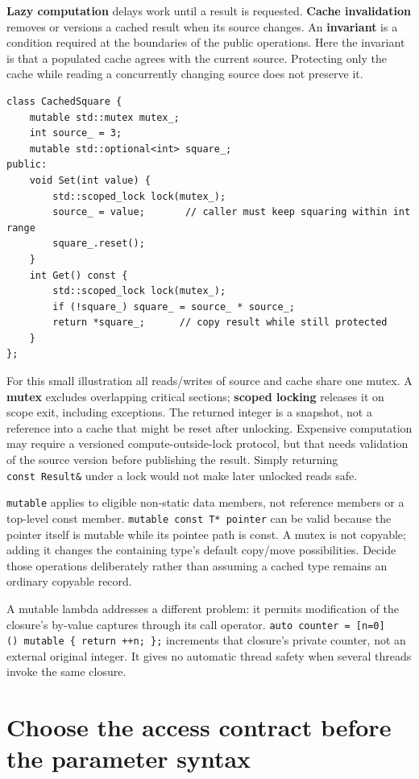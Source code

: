 \textbf{Lazy computation} delays work until a result is requested. \textbf{Cache invalidation} removes or versions a cached result when its source changes. An \textbf{invariant} is a condition required at the boundaries of the public operations. Here the invariant is that a populated cache agrees with the current source. Protecting only the cache while reading a concurrently changing source does not preserve it.

\begin{verbatim}
class CachedSquare {
    mutable std::mutex mutex_;
    int source_ = 3;
    mutable std::optional<int> square_;
public:
    void Set(int value) {
        std::scoped_lock lock(mutex_);
        source_ = value;       // caller must keep squaring within int range
        square_.reset();
    }
    int Get() const {
        std::scoped_lock lock(mutex_);
        if (!square_) square_ = source_ * source_;
        return *square_;      // copy result while still protected
    }
};
\end{verbatim}

For this small illustration all reads/writes of source and cache share one mutex. A \textbf{mutex} excludes overlapping critical sections; \textbf{scoped locking} releases it on scope exit, including exceptions. The returned integer is a snapshot, not a reference into a cache that might be reset after unlocking. Expensive computation may require a versioned compute-outside-lock protocol, but that needs validation of the source version before publishing the result. Simply returning \texttt{const\ Result\&} under a lock would not make later unlocked reads safe.

\texttt{mutable} applies to eligible non-static data members, not reference members or a top-level const member. \texttt{mutable\ const\ T*\ pointer} can be valid because the pointer itself is mutable while its pointee path is const. A mutex is not copyable; adding it changes the containing type's default copy/move possibilities. Decide those operations deliberately rather than assuming a cached type remains an ordinary copyable record.

A mutable lambda addresses a different problem: it permits modification of the closure's by-value captures through its call operator. \texttt{auto\ counter\ =\ {[}n=0{]}()\ mutable\ \{\ return\ ++n;\ \};} increments that closure's private counter, not an external original integer. It gives no automatic thread safety when several threads invoke the same closure.

\section{Choose the access contract before the parameter syntax}\label{01-foundations-i-ch003-choose-the-access-contract-before-the-parameter-syntax}

